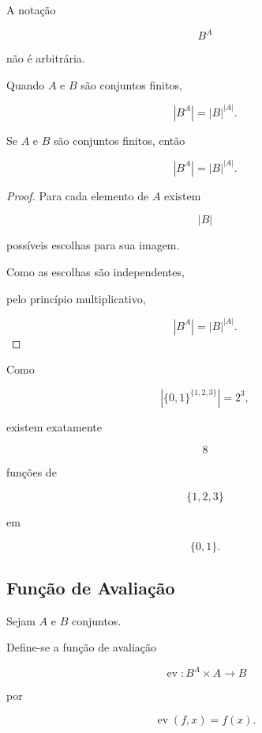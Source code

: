 \documentclass[../../main]{subfiles}
\begin{document}
\begin{obs}

	A notação

	\[
		B^A
	\]

	não é arbitrária.

	Quando \(A\) e \(B\) são conjuntos finitos,

	\[
		|B^A|
		=
		|B|^{|A|}.
	\]

\end{obs}

\begin{prop}
	\label{prop:matematica:funcoes:espacos:cardinalidade-finita}

	Se \(A\) e \(B\) são conjuntos finitos, então

	\[
		|B^A|
		=
		|B|^{|A|}.
	\]

\end{prop}

\begin{proof}

	Para cada elemento de \(A\) existem

	\[
		|B|
	\]

	possíveis escolhas para sua imagem.

	Como as escolhas são independentes,

	pelo princípio multiplicativo,

	\[
		|B^A|
		=
		|B|^{|A|}.
	\]

\end{proof}

\begin{ex}

	Como

	\[
		|\{0,1\}^{\{1,2,3\}}|
		=
		2^3,
	\]

	existem exatamente

	\[
		8
	\]

	funções de

	\[
		\{1,2,3\}
	\]

	em

	\[
		\{0,1\}.
	\]

\end{ex}

\subsection{Função de Avaliação}

\begin{defn}
	\label{def:matematica:funcoes:espacos:avaliacao}

	Sejam \(A\) e \(B\) conjuntos.

	Define-se a função de avaliação

	\[
		\operatorname{ev}
		:
		B^A\times A
		\to
		B
	\]

	por

	\[
		\operatorname{ev}(f,x)
		=
		f(x).
	\]

\end{defn}
\end{document}
